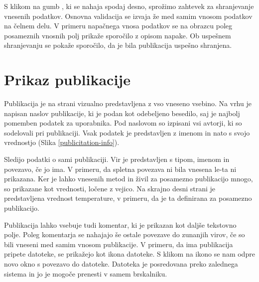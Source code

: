 \documentclass[a4paper, 12pt]{book}
\begin{document}
S klikom na gumb , ki se nahaja spodaj desno, sprožimo zahtevek za shranjevanje vnesenih podatkov. Osnovna validacija se izvaja že med samim vnosom podatkov na čelnem delu. V primeru napačnega vnosa podatkov se na obrazcu poleg posameznih vnosnih polj prikaže sporočilo z opisom napake. Ob uspešnem shranjevanju se pokaže sporočilo, da je bila publikacija uspešno shranjena.


\section{Prikaz publikacije}
Publikacija je na strani vizualno predstavljena z vso vneseno vsebino. Na vrhu je napisan naslov publikacije, ki je podan kot odebeljeno besedilo, saj je najbolj pomemben podatek za uporabnika. Pod naslovom so izpisani vsi avtorji, ki so sodelovali pri publikaciji. Vsak podatek je predstavljen z imenom in nato s svojo vrednostjo (Slika \ref{publicitation-info}).

Sledijo podatki o sami publikaciji. Vir je predstavljen s tipom, imenom in povezavo, če jo ima. V primeru, da spletna povezava ni bila vnesena le-ta ni prikazana. Ker je lahko vnesenih metod in živil za posamezno publikacijo mnogo, so prikazane kot vrednosti, ločene z vejico. Na skrajno desni strani je predstavljena vrednost temperature, v primeru, da je ta definirana za posamezno publikacijo.

Publikacija lahko vsebuje tudi komentar, ki je prikazan kot daljše tekstovno polje. Poleg komentarja se nahajajo še ostale povezave do zunanjih virov, če so bili vneseni med samim vnosom publikacije. V primeru, da ima publikacija pripete datoteke, se prikažejo kot ikona datoteke. S klikom na ikono se nam odpre novo okno s povezavo do datoteke. Datoteka je posredovana preko zalednega sistema in jo je mogoče prenesti v samem brskalniku.
\end{document}
